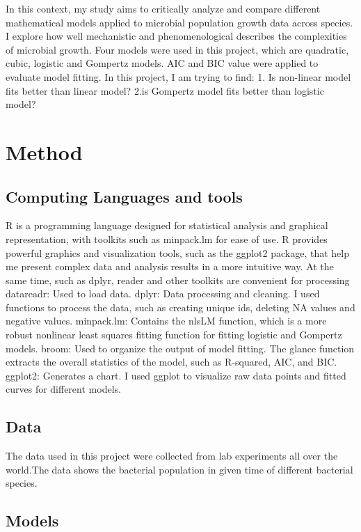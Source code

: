 \documentclass[11pt]{article}
\begin{document}
In this context, my study aims to critically analyze and compare different mathematical models applied to microbial population growth data across species. I explore how well mechanistic and phenomenological describes the complexities of microbial growth. Four models were used in this project, which are quadratic, cubic, logistic and Gompertz models. AIC and BIC value were applied to evaluate model fitting. In this project, I am trying to find: 1. Is non-linear model fits better than linear model? 2.is Gompertz model fits better than logistic model?

\section{Method}
\subsection{Computing Languages and tools}
R is a programming language designed for statistical analysis and graphical representation, with toolkits such as minpack.lm for ease of use.
R provides powerful graphics and visualization tools, such as the ggplot2 package, that help me present complex data and analysis results in a more intuitive way. 
At the same time, such as dplyr, reader and other toolkits are convenient for processing datareadr: Used to load data. 
dplyr: Data processing and cleaning. I used functions to process the data, such as creating unique ids, deleting NA values and negative values.
minpack.lm: Contains the nlsLM function, which is a more robust nonlinear least squares fitting function for fitting logistic and Gompertz models.
broom: Used to organize the output of model fitting. The glance function extracts the overall statistics of the model, such as R-squared, AIC, and BIC.
ggplot2: Generates a chart. I used ggplot to visualize raw data points and fitted curves for different models.

\subsection{Data}
The data used in this project were collected from lab experiments all over the world.The data shows the bacterial population in given time of different bacterial species.

\subsection{Models}
\end{document}
